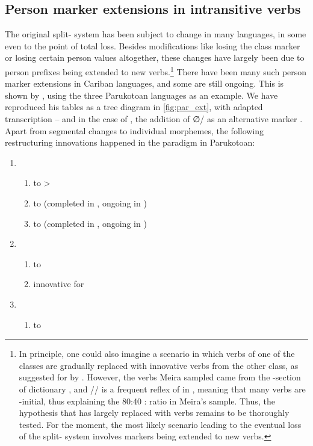 \subsection{Person marker extensions in intransitive verbs}
\label{sec:extensions_intro}
The original \PC split- system has been subject to change in many languages, in some even to the point of total loss.
Besides modifications like losing the  class marker  or losing certain person values altogether, these changes have largely been due to person prefixes being extended to new verbs.\footnote{
In principle, one could also imagine a scenario in which verbs of one of the classes are gradually replaced with innovative verbs from the other class, as suggested for \panare by \textcite[225]{meira2000split}.
However, the verbs Meira sampled came from the -section of  dictionary , and \slash{}\slash{} is a frequent reflex of \detrz in \panare, meaning that many  verbs are -initial, thus explaining the 80:40 : ratio in Meira's sample.
Thus, the hypothesis that \panare has largely replaced  with  verbs remains to be thoroughly tested.
For the moment, the most likely scenario leading to the eventual loss of the split- system involves markers being extended to new verbs.}
There have been many such person marker extensions in Cariban languages, and some are still ongoing.
This is shown by \textcite{gildea1998}, using the three Parukotoan languages as an example.
We have reproduced his tables as a tree diagram in \cref{fig:par_ext}, with adapted transcription -- and in the case of \kaxui, the addition of ∅/ as an alternative  marker .
Apart from segmental changes to individual morphemes, the following restructuring innovations happened in the \setone paradigm in Parukotoan:

\begin{enumerate}
\item \PPar \begin{enumerate}
	\item {}  to >
	\item {}  to  (completed in \PWai, ongoing in \kaxui)
	\item {}  to  (completed in \PWai, ongoing in \kaxui)
\end{enumerate}
\item \PWai \begin{enumerate}
\item {}  to 
\item innovative   for 
\end{enumerate}
\item \waiwai \begin{enumerate}
\item {}  to \end{enumerate}
\end{enumerate}

